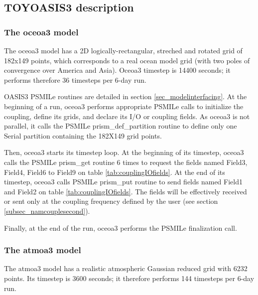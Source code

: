 \subsection{TOYOASIS3 description}
\label{subsec_toyoasis3}

\subsubsection{The oceoa3 model}
\label{sec:oceoa3}

The oceoa3 model has a 2D logically-rectangular, streched
and rotated grid of 182x149 points, which corresponds to a real ocean
model grid (with two poles of convergence over America and Asia).
Oceoa3 timestep is 14400 seconds; it performs therefore 36 timesteps
per 6-day run.

OASIS3 PSMILe routines are detailed in
section \ref{sec_modelinterfacing}. At the beginning of a run, oceoa3
performs appropriate PSMILe calls to initialize the coupling, define
its grids, and declare its I/O or coupling fields. As oceoa3 is not
parallel, it calls the PSMILe prism\_def\_partition routine to
define only one Serial partition containing the 182X149 grid points.

Then, oceoa3 starts its timestep loop. At the beginning of its
timestep, oceoa3 calls the PSMILe prism\_get routine 6 times to
request the fields named Field3, Field4, Field6 to Field9 on table
\ref{tab:couplingIOfields}. At the end of its timestep, oceoa3 calls
PSMILe prism\_put routine to send fields named Field1 and Field2 on
table \ref{tab:couplingIOfields}. The fields will be effectively
received or sent only at the coupling frequency defined by the user
(see section \ref{subsec_namcouplesecond}).


Finally, at the end of the run, oceoa3 performs the PSMILe finalization call. 

\subsubsection{The atmoa3 model}
\label{sec:atmoa3} 

The atmoa3 model has a realistic atmospheric Gaussian reduced
grid with 6232 points. Its timestep is 3600 seconds; it therefore performs 144
timesteps per 6-day run.

